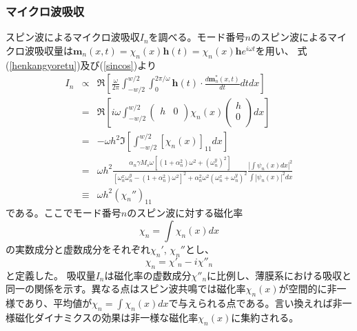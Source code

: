 \subsubsection{マイクロ波吸収}
スピン波によるマイクロ波吸収$I_n$を調べる。モード番号$n$のスピン波によるマイクロ波吸収量は$\bm{m}_n(x,t)=\chi_n(x)\bm{h}(t)=\chi_n(x)\bm{h}e^{i\omega t}$を用い、
式(\ref{henkangyoretu})及び(\ref{sincos})より
\begin{eqnarray}
 {I_n} &\propto& \Re \left[ {\frac{\omega }{{2\pi }}\mathop \int \nolimits_{ - w/2}^{w/2} \mathop \int \nolimits_0^{2\pi /\omega } \bm{h}(t)\cdot\frac{{d{\bm{m}_n^*}(x,t)}}{{dt}}dtdx} \right]  \nonumber \\ 
  &=& \Re \left[ {i\omega \mathop \int \nolimits_{ - w/2}^{w/2} \left( {\begin{array}{*{20}{c}}
   h & 0  \\
\end{array}} \right){\chi _n}(x)\left( {\begin{array}{*{20}{c}}
   h  \\
   0  \\
\end{array}} \right)dx} \right]  \nonumber \\ 
  &=&  - \omega {h^2}\Im \left[ {\mathop \int \nolimits_{ - w/2}^{w/2} {{[{\chi _n}(x)]}_{11}}dx} \right] \nonumber  \\ 
  &=& \omega {h^2}\frac{{{\alpha _n}\gamma {M_s}\omega \left[ {(1 + \alpha _n^2){\omega ^2} + {{(\omega _n^y)}^2}} \right]}}{{{{\left[ {\omega _n^x\omega _n^y - (1 + \alpha _n^2){\omega ^2}} \right]}^2} + \alpha _n^2{\omega ^2}{{(\omega _n^x + \omega _n^y)}^2}}}\frac{{{{\left| {\int {{\psi _n}(x)dx} } \right|}^2}}}{{\int {{{\left| {{\psi _n}(x)} \right|}^2}dx} }} \nonumber \\ 
  &\equiv &\omega {h^2}{(\chi _n'')_{11}} 
\end{eqnarray}
である。ここでモード番号$n$のスピン波に対する磁化率
\begin{equation}
 \chi_n=\int \chi_n(x) dx
\end{equation}
の実数成分と虚数成分をそれぞれ$\chi_n'$, $\chi_n''$とし、
\begin{equation}{\chi _n} = {\chi '_n} - i{\chi'' _n}\end{equation}
と定義した。
吸収量$I_n$は磁化率の虚数成分$\chi''_n$に比例し、薄膜系における吸収と同一の関係を示す。異なる点はスピン波共鳴では磁化率$\chi_n(x)$が空間的に非一様であり、平均値が$\displaystyle \chi_n = \int \chi_n(x) dx $で与えられる点である。言い換えれば非一様磁化ダイナミクスの効果は非一様な磁化率$\chi_n(x)$に集約される。



